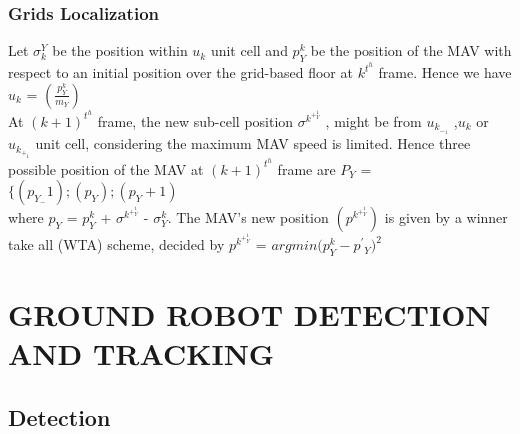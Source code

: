 \documentclass[12pt]{article}
\begin{document}
\subsubsection{Grids Localization}
Let $\sigma_k^Y$ be  the  position  within $u_k$ unit  cell  and $p^k_Y$ be  the position  of  the  MAV  with  respect  to  an  initial  position  over the grid-based floor at $k^t^h$ frame. Hence we have \\
$u_k$ = $\left(\frac{p^k_Y}{m_Y}\right)$ \\
At $(k + 1)^t^h$ frame, the new sub-cell position $\sigma^k^+^1_Y$ , might be from $u_k_-_1$ ,$u_k$ or $u_k_+_1$ unit cell, considering the maximum MAV speed is limited. Hence three possible position of the MAV at $(k + 1)^t^h$ frame are $P_Y$ = $\{(p_Y_- 1);(p_Y);(p_Y + 1)$ \\
where $p_Y$ = $p^k_Y$ + $\sigma^k^+^1_Y$ - $\sigma^k_Y$. The MAV’s new position $(p^k^+^1_Y)$ is given by a winner take all (WTA) scheme, decided by $p^k^+^1_Y$ = $argmin(p^k_Y - p^'$$_Y )^2$
\section{GROUND ROBOT DETECTION AND TRACKING}
    \subsection{Detection}
\end{document}
